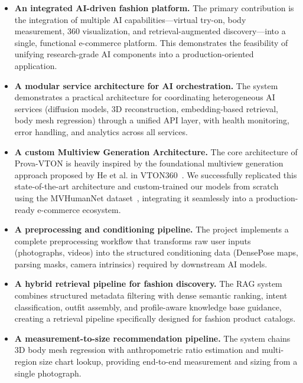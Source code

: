 \begin{itemize}[leftmargin=*]
    \item \textbf{An integrated AI-driven fashion platform.} The primary contribution is the integration of multiple AI capabilities—virtual try-on, body measurement, 360 visualization, and retrieval-augmented discovery—into a single, functional e-commerce platform. This demonstrates the feasibility of unifying research-grade AI components into a production-oriented application.

    \item \textbf{A modular service architecture for AI orchestration.} The system demonstrates a practical architecture for coordinating heterogeneous AI services (diffusion models, 3D reconstruction, embedding-based retrieval, body mesh regression) through a unified API layer, with health monitoring, error handling, and analytics across all services.

    \item \textbf{A custom Multiview Generation Architecture.} The core architecture of Prova-VTON is heavily inspired by the foundational multiview generation approach proposed by He et al. in VTON360~\cite{he2025vton360}. We successfully replicated this state-of-the-art architecture and custom-trained our models from scratch using the MVHumanNet dataset~\cite{zheng2024mvhumannet}, integrating it seamlessly into a production-ready e-commerce ecosystem.

    \item \textbf{A preprocessing and conditioning pipeline.} The project implements a complete preprocessing workflow that transforms raw user inputs (photographs, videos) into the structured conditioning data (DensePose maps, parsing masks, camera intrinsics) required by downstream AI models.

    \item \textbf{A hybrid retrieval pipeline for fashion discovery.} The RAG system combines structured metadata filtering with dense semantic ranking, intent classification, outfit assembly, and profile-aware knowledge base guidance, creating a retrieval pipeline specifically designed for fashion product catalogs.

    \item \textbf{A measurement-to-size recommendation pipeline.} The system chains 3D body mesh regression with anthropometric ratio estimation and multi-region size chart lookup, providing end-to-end measurement and sizing from a single photograph.
\end{itemize}


